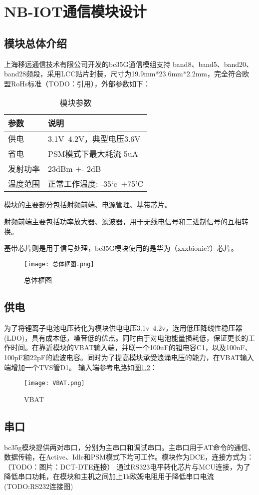 
\chapter{NB-IOT通信模块设计}
\section{模块总体介绍}

上海移远通信技术有限公司开发的bc35G通信模组支持 band8、band5、band20、band28频段，采用LCC贴片封装，尺寸为19.9mm*23.6mm*2.2mm，完全符合欧盟RoHs标准（TODO：引用），外部参数如下：

\begin{table}[h!]
\caption{模块参数}
\begin{tabular}{ll}
\toprule
参数&说明\\
\midrule
供电&3.1V~4.2V，典型电压3.6V\\
省电&PSM模式下最大耗流 5uA\\
发射功率&23dBm +- 2dB\\
温度范围&正常工作温度: -35‘c~+75'C\\
\bottomrule
\end{tabular}
\label{模块参数}
\end{table}

模块的主要部分包括射频前端、电源管理、基带芯片。

射频前端主要包括功率放大器、滤波器，用于无线电信号和二进制信号的互相转换。

基带芯片则是用于信号处理，bc35G模块使用的是华为（xxxbionic?）芯片。

\begin{figure}[H]
	\centering
	\texttt{[image: 总体框图.png]}
	\caption{总体框图}
	\label{总体框图}
\end{figure}


\section{供电}
为了将锂离子电池电压转化为模块供电电压3.1v~4.2v，选用低压降线性稳压器(LDO)，具有成本低，噪音低的优点。同时由于对电池能量损耗低，保证更长的工作时间。在靠近模块的VBAT输入端，并联一个100uF的钽电容C1，以及100nF、100pF和22pF的滤波电容。同时为了提高模块承受浪涌电压的能力，在VBAT输入端增加一个TVS管D1。
输入端参考电路如图\ref{VBAT}：
\begin{figure}[H]
	\centering
	\texttt{[image: VBAT.png]}
	\caption{VBAT}
	\label{VBAT}
\end{figure}

\section{串口}
bc35g模块提供两对串口，分别为主串口和调试串口。主串口用于AT命令的通信、数据传输，在Active、Idle和PSM模式下均可工作。模块作为DCE，连接方式为：（TODO：图片：DCT-DTE连接）
通过RS323电平转化芯片与MCU连接，为了降低串口功耗，在模块和主机之间加上1k欧姆电阻用于降低串口电流(TODO:RS232连接图)

